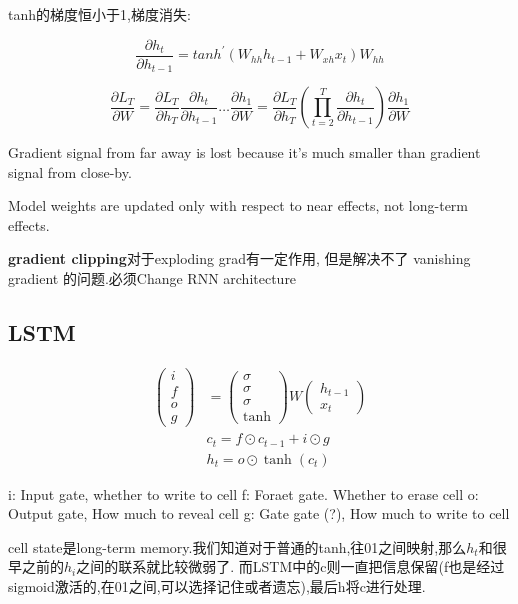 	tanh的梯度恒小于1,梯度消失:

	\[
		\frac{\partial h_t}{\partial h_{t-1}}=tanh^{\prime}(W_{hh}h_{t-1}+W_{xh}x_t)W_{hh}	
	\]

	\[
		\frac{\partial L_T}{\partial W}=\frac{\partial L_T}{\partial h_T}\frac{\partial h_t}{\partial h_{t-1}}\ldots\frac{\partial h_1}{\partial W}=\frac{\partial L_T}{\partial h_T}(\prod_{t=2}^T\frac{\partial h_t}{\partial h_{t-1}})\frac{\partial h_1}{\partial W}	
	\]

	Gradient signal from far away is lost because it's much smaller than 
	gradient signal from close-by.

	Model weights are updated only with respect to near effects, not 
	long-term effects.
	
	\textbf{gradient clipping}对于exploding grad有一定作用, 但是解决不了 vanishing gradient 的问题.必须Change RNN architecture
	
	\subsection{LSTM}

	\[
	\begin{aligned}
		\begin{pmatrix}i\\f\\o\\g\end{pmatrix}& =\begin{pmatrix}\sigma\\\sigma\\\sigma\\\tanh\end{pmatrix}W\begin{pmatrix}h_{t-1}\\x_t\end{pmatrix}  \\
		&c_{t} =f\odot c_{t-1}+i\odot g  \\
		&h_{t} =o\odot\tanh(c_t) 
	\end{aligned}
	\]

	i: Input gate, whether to write to cell
	f: Foraet gate. Whether to erase cell
	o: Output gate, How much to reveal cell
	g: Gate gate (?), How much to write to cell
	
	cell state是long-term memory.我们知道对于普通的tanh,往01之间映射,那么$h_t$和很早之前的$h_i$之间的联系就比较微弱了.
	而LSTM中的c则一直把信息保留(f也是经过sigmoid激活的,在01之间,可以选择记住或者遗忘),最后h将c进行处理.
	

